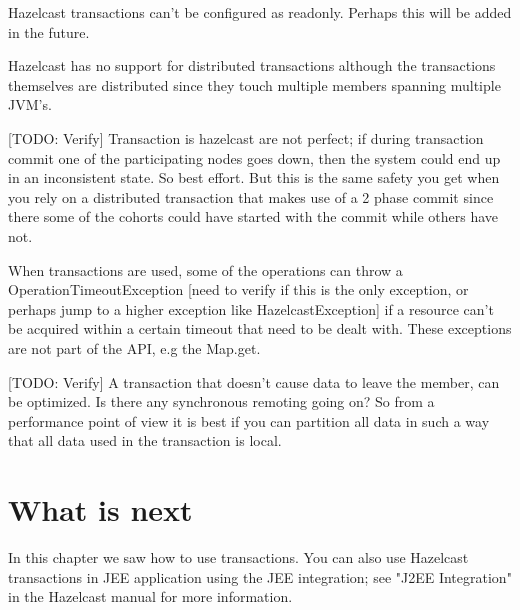 Hazelcast transactions can't be configured as readonly. Perhaps this will be added in the future.

Hazelcast has no support for distributed transactions although the transactions themselves are distributed since they touch multiple members spanning multiple JVM's.

[TODO: Verify] Transaction is hazelcast are not perfect; if during transaction commit one of the participating nodes goes down, then the system could end up in an inconsistent state. So best effort. But this is the same safety you get when you rely on a distributed transaction that makes use of a 2 phase commit since there some of the cohorts could have started with the commit while others have not.

When transactions are used, some of the operations can throw a OperationTimeoutException [need to verify if this is the only exception, or perhaps jump to a higher exception like HazelcastException] if a resource can't be acquired within a certain timeout that need to be dealt with. These exceptions are not part of the API, e.g the Map.get.

[TODO: Verify] A transaction that doesn't cause data to leave the member, can be optimized. Is there any synchronous remoting going on? So from a performance point of view it is best if you can partition all data in such a way that all data used in the transaction is local. 

\section{What is next}
In this chapter we saw how to use transactions. You can also use Hazelcast transactions in JEE application using the JEE integration; see "J2EE Integration" in the Hazelcast manual for more information.